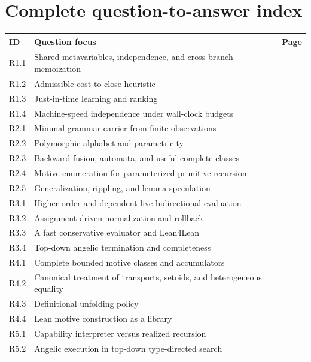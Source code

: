 \documentclass[11pt,a4paper]{article}
\renewcommand{\arraystretch}{1.16}
\theoremstyle{definition}
\theoremstyle{remark}
\begin{document}
\section{Complete question-to-answer index}\label{app:map}
\begingroup
\renewcommand{\arraystretch}{1.02}
\small
\begin{longtable}{@{}L{14mm}L{126mm}r@{}}
\toprule
ID & Question focus & Page\\
\midrule\endhead
R1.1 & Shared metavariables, independence, and cross-branch memoization & \pageref{q:R1.1}\\
R1.2 & Admissible cost-to-close heuristic & \pageref{q:R1.2}\\
R1.3 & Just-in-time learning and ranking & \pageref{q:R1.3}\\
R1.4 & Machine-speed independence under wall-clock budgets & \pageref{q:R1.4}\\
R2.1 & Minimal grammar carrier from finite observations & \pageref{q:R2.1}\\
R2.2 & Polymorphic alphabet and parametricity & \pageref{q:R2.2}\\
R2.3 & Backward fusion, automata, and useful complete classes & \pageref{q:R2.3}\\
R2.4 & Motive enumeration for parameterized primitive recursion & \pageref{q:R2.4}\\
R2.5 & Generalization, rippling, and lemma speculation & \pageref{q:R2.5}\\
R3.1 & Higher-order and dependent live bidirectional evaluation & \pageref{q:R3.1}\\
R3.2 & Assignment-driven normalization and rollback & \pageref{q:R3.2}\\
R3.3 & A fast conservative evaluator and Lean4Lean & \pageref{q:R3.3}\\
R3.4 & Top-down angelic termination and completeness & \pageref{q:R3.4}\\
R4.1 & Complete bounded motive classes and accumulators & \pageref{q:R4.1}\\
R4.2 & Canonical treatment of transports, setoids, and heterogeneous equality & \pageref{q:R4.2}\\
R4.3 & Definitional unfolding policy & \pageref{q:R4.3}\\
R4.4 & Lean motive construction as a library & \pageref{q:R4.4}\\
R5.1 & Capability interpreter versus realized recursion & \pageref{q:R5.1}\\
R5.2 & Angelic execution in top-down type-directed search & \pageref{q:R5.2}\\

\end{longtable}
\end{document}
